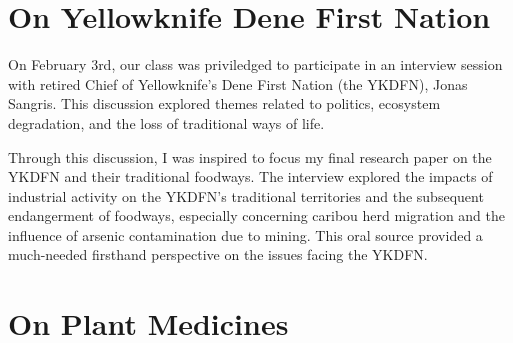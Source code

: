 \documentclass{report}
\begin{document}
\hspace{24pt} %

\hspace{24pt} %







\clearpage

\section{On Yellowknife Dene First Nation}

\hspace{24pt} On February 3rd, our class was priviledged to participate in an interview session with retired Chief of Yellowknife's Dene First Nation (the YKDFN), Jonas Sangris. This discussion explored themes related to politics, ecosystem degradation, and the loss of traditional ways of life.

\hspace{24pt} Through this discussion, I was inspired to focus my final research paper on the YKDFN and their traditional foodways. The interview explored the impacts of industrial activity on the YKDFN's traditional territories and the subsequent endangerment of foodways, especially concerning caribou herd migration and the influence of arsenic contamination due to mining. This oral source provided a much-needed firsthand perspective on the issues facing the YKDFN.

\clearpage

\section{On Plant Medicines}

\end{document}

